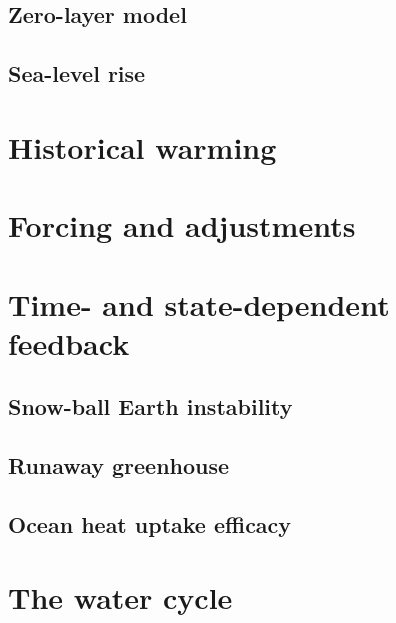 \documentclass[12pt]{book}
\begin{document}
\section{Zero-layer model}
\section{Sea-level rise}

\chapter{Historical warming}

\chapter{Forcing and adjustments}

\chapter{Time- and state-dependent feedback}
\section{Snow-ball Earth instability}
\section{Runaway greenhouse}
\section{Ocean heat uptake efficacy}

\chapter{The water cycle}


\end{document}
